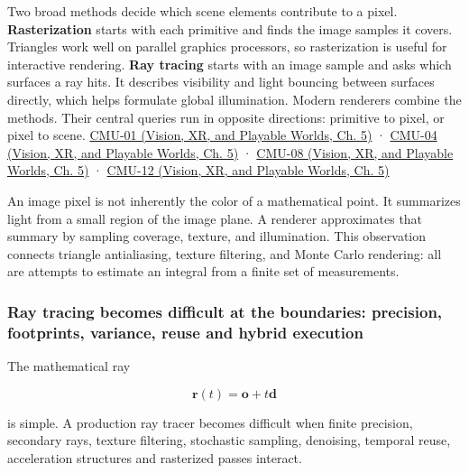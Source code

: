 Two broad methods decide which scene elements contribute to a pixel. \textbf{Rasterization} starts with each primitive and finds the image samples it covers. Triangles work well on parallel graphics processors, so rasterization is useful for interactive rendering. \textbf{Ray tracing} starts with an image sample and asks which surfaces a ray hits. It describes visibility and light bouncing between surfaces directly, which helps formulate global illumination. Modern renderers combine the methods. Their central queries run in opposite directions: primitive to pixel, or pixel to scene. \href{../07-Vision-XR-and-Playable-Worlds/main.pdf\#nameddest=04-visual-computing-ii-ch036-cmu-01---course-overview}{CMU-01 (Vision, XR, and Playable Worlds, Ch. 5)} · \href{../07-Vision-XR-and-Playable-Worlds/main.pdf\#nameddest=04-visual-computing-ii-ch036-cmu-04---drawing-a-triangle-and-an-intro-to-sampling}{CMU-04 (Vision, XR, and Playable Worlds, Ch. 5)} · \href{../07-Vision-XR-and-Playable-Worlds/main.pdf\#nameddest=04-visual-computing-ii-ch036-cmu-08---depth-and-transparency}{CMU-08 (Vision, XR, and Playable Worlds, Ch. 5)} · \href{../07-Vision-XR-and-Playable-Worlds/main.pdf\#nameddest=04-visual-computing-ii-ch036-cmu-12---geometric-queries}{CMU-12 (Vision, XR, and Playable Worlds, Ch. 5)}

An image pixel is not inherently the color of a mathematical point. It summarizes light from a small region of the image plane. A renderer approximates that summary by sampling coverage, texture, and illumination. This observation connects triangle antialiasing, texture filtering, and Monte Carlo rendering: all are attempts to estimate an integral from a finite set of measurements.

\subsubsection{Ray tracing becomes difficult at the boundaries: precision, footprints, variance, reuse and hybrid execution}\label{03-visual-computing-i-ch001-ray-tracing-becomes-difficult-at-the-boundaries-precision-footprints-variance-reuse-and-hybrid-execution}

\hypertarget{03-visual-computing-i-ch001-ray-tracing-becomes-difficult-at-the-boundaries-precision-footprints-variance-reuse-and-hybrid-execution}{}

The mathematical ray

\[
\mathbf r(t)=\mathbf o+t\mathbf d
\]

is simple. A production ray tracer becomes difficult when finite precision, secondary rays, texture filtering, stochastic sampling, denoising, temporal reuse, acceleration structures and rasterized passes interact.

